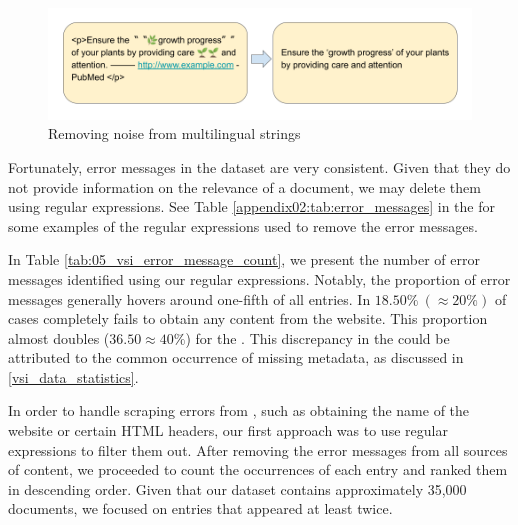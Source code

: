 \begin{figure}
    \centering
    \includegraphics[width=\textwidth]{Figures/05/05_multilingual_string_cleaning.png}
    \caption{Removing noise from multilingual strings}
    \label{fig:05_multilingual_string_cleaning}
\end{figure}


\label{vsi_deleting_error_messages}

Fortunately, error messages in the dataset are very consistent. Given that they do not provide information on the relevance of a document, we may delete them using regular expressions. See Table \ref{appendix02:tab:error_messages} in the \appendixname{} for some examples of the regular expressions used to remove the error messages. 



In Table \ref{tab:05_vsi_error_message_count}, we present the number of error messages identified using our regular expressions. Notably, the proportion of error messages generally hovers around one-fifth of all entries. In $18.50\%\ (\approx 20\%)$ of cases \trafilatura{} completely fails to obtain any content from the website. This proportion almost doubles ($36.50\approx 40\%$) for the \trafilaturaAbstract{}. This discrepancy in the \trafilaturaAbstract{} could be attributed to the common occurrence of missing metadata, as discussed in \headerName{} \ref{vsi_data_statistics}.




In order to handle scraping errors from \trafilatura{}, such as obtaining the name of the website or certain HTML headers, our first approach was to use regular expressions to filter them out. After removing the error messages from all sources of content, we proceeded to count the occurrences of each entry and ranked them in descending order. Given that our dataset contains approximately 35,000 documents, we focused on entries that appeared at least twice.

